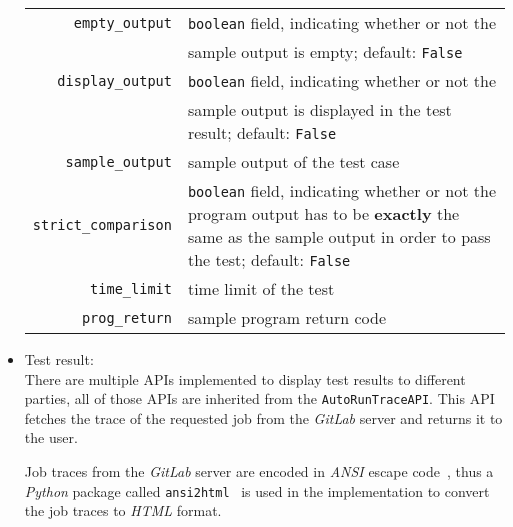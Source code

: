 \begin{itemize}
\begin{table}[H]
\begin{tabular}[h]{r|p{4in}}
        \texttt{empty\_output} & \texttt{boolean} field, indicating whether or not the \\
            & sample output is empty; default: \texttt{False} \\
        \hline
        \texttt{display\_output} & \texttt{boolean} field, indicating whether or not the \\
            & sample output is displayed in the test result;  default: \texttt{False} \\
        \hline
        \texttt{sample\_output} & sample output of the test case \\
        \hline
        \texttt{strict\_comparison} & \texttt{boolean} field, indicating
            whether or not the program
            output has to be \textbf{exactly} the same as the sample output
            in order to pass the test; default: \texttt{False} \\
        \hline
        \hline
        \texttt{time\_limit} & time limit of the test \\
        \hline
        \texttt{prog\_return} & sample program return code \\
        \hline
    \end{tabular}
\end{table}

    \item Test result: \\
    There are multiple APIs implemented to display test results to different
    parties, all of those APIs are inherited from the \texttt{AutoRunTraceAPI}.
    This API fetches the trace of the requested job from the \emph{GitLab}
    server and returns it to the user.

    Job traces from the \emph{GitLab} server are encoded in \emph{ANSI} escape
    code~\cite{ansi}, thus a \emph{Python} package called
    \texttt{ansi2html}~\cite{ansi2html}
    is used in the implementation to convert the job traces to \emph{HTML}
    format.
\end{itemize}

